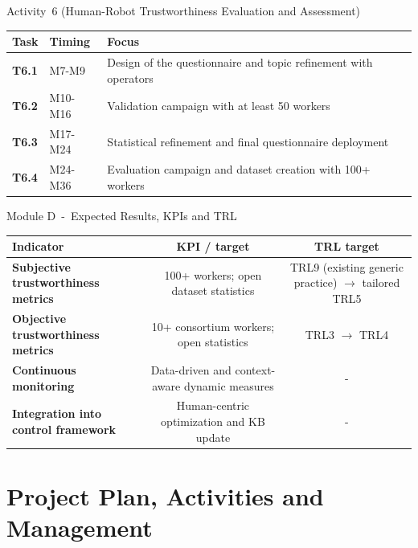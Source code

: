 \documentclass[aspectratio=169,10pt]{beamer}
\begin{document}
\begin{frame}{Activity~6 (Human-Robot Trustworthiness Evaluation and Assessment)}

\small
\begin{tabularx}{\textwidth}{>{\bfseries}p{} p{} X}
\toprule
Task & Timing & Focus \\
\midrule
T6.1 & M7-M9 & Design of the questionnaire and topic refinement with operators \\
T6.2 & M10-M16 & Validation campaign with at least 50 workers \\
T6.3 & M17-M24 & Statistical refinement and final questionnaire deployment \\
T6.4 & M24-M36 & Evaluation campaign and dataset creation with 100+ workers \\
\bottomrule
\end{tabularx}

\end{frame}


\begin{frame}{Module D~-~Expected Results, KPIs and TRL}

\scriptsize
\begin{tabularx}{\textwidth}{>{\bfseries}X c c}
\toprule
Indicator & KPI / target & TRL target \\
\midrule
Subjective trustworthiness metrics & 100+ workers; open dataset statistics & TRL9 (existing generic practice) $\rightarrow$ tailored TRL5 \\
Objective trustworthiness metrics & 10+ consortium workers; open statistics & TRL3 $\rightarrow$ TRL4 \\
Continuous monitoring & Data-driven and context-aware dynamic measures &~-~\\
Integration into control framework & Human-centric optimization and KB update &~-~\\
\bottomrule
\end{tabularx}

\end{frame}


\section{Project Plan, Activities and Management}
\end{document}
